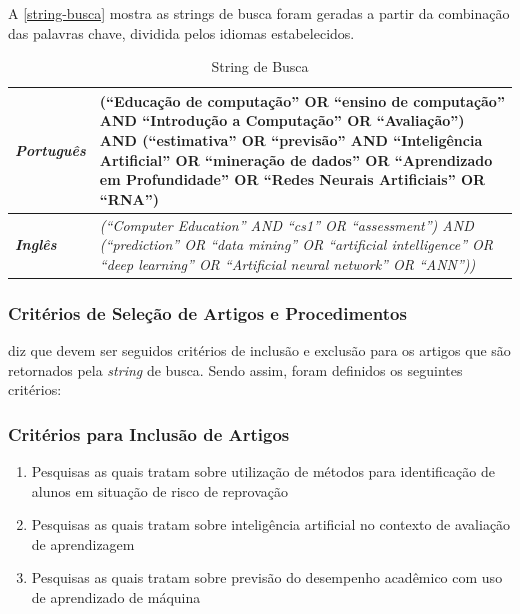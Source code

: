 \documentclass[
	12pt,				%
	openright,			%
	oneside,
	a4paper,			%
	english,			%
	french,				%
	spanish,			%
	brazil,				%
	]{abntex2}
\begin{document}
A \autoref{string-busca} mostra as strings de busca foram geradas a partir da combinação das palavras chave, dividida pelos idiomas estabelecidos.

\begin{center}
\begin{longtable}{|| p{3cm} || p{10cm} ||}
\caption{String de Busca}
\label{string-busca}
\hline
\textit{\textbf{Português}} & (``Educação de computação'' OR ``ensino de computação'' AND ``Introdução a Computação'' OR ``Avaliação'') AND (``estimativa'' OR ``previsão'' AND ``Inteligência Artificial'' OR ``mineração de dados'' OR ``Aprendizado em Profundidade'' OR ``Redes Neurais Artificiais'' OR ``RNA'')\\
\hline \hline
\textit{\textbf{Inglês}} & \textit{(``Computer Education'' AND ``cs1'' OR ``assessment'') AND (``prediction'' OR ``data mining'' OR ``artificial intelligence'' OR ``deep learning'' OR ``Artificial neural network'' OR ``ANN''))}\\
 \hline \hline
\end{longtable}
\end{center}

\subsubsection{Critérios de Seleção de Artigos e Procedimentos}
 diz que devem ser seguidos critérios de inclusão e exclusão para os artigos que são retornados pela \textit{string} de busca. Sendo assim, foram definidos os seguintes critérios:

\subsubsection{Critérios para Inclusão de Artigos}

\begin{enumerate}
    \item Pesquisas as quais tratam sobre utilização de métodos para identificação de alunos em situação de risco de reprovação
    \item Pesquisas as quais tratam sobre inteligência artificial no contexto de avaliação de aprendizagem
    \item Pesquisas as quais tratam sobre previsão do desempenho acadêmico com uso de aprendizado de máquina
\end{enumerate}
\end{document}

